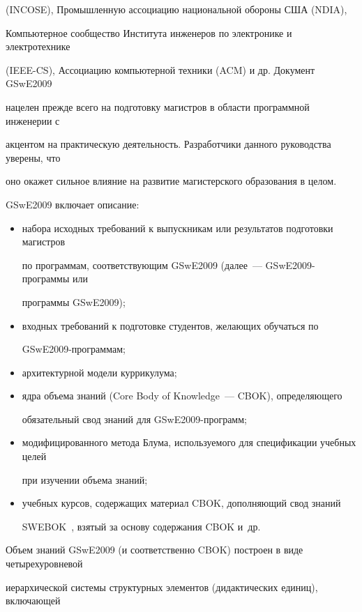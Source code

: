 (INCOSE), Промышленную ассоциацию национальной обороны США (NDIA), 

Компьютерное сообщество Института инженеров по электронике и электротехнике 

(IEEE-CS), Ассоциацию компьютерной техники (ACM) и др. Документ GSwE2009 

нацелен прежде всего на подготовку магистров в области программной инженерии с 

акцентом на практическую деятельность. Разработчики данного руководства уверены, что 

оно окажет сильное влияние на развитие магистерского образования в целом.



GSwE2009 включает описание:

\begin{itemize}

\item  набора исходных требований к выпускникам или результатов подготовки магистров 

по программам, соответствующим GSwE2009 (далее~--- GSwE2009-про\-грам\-мы или 

программы GSwE2009);

\item входных требований к подготовке студентов, желающих обучаться по 

GSwE2009-программам;

\item архитектурной модели куррикулума;

\item ядра объема знаний (Core Body of Knowledge~--- CBOK), определяющего 

обязательный свод знаний для GSwE2009-программ;

\item модифицированного метода Блума, используемого для спецификации учебных целей 

при изучении объема знаний;

\item учебных курсов, содержащих материал CBOK, дополняющий свод знаний 

SWEBOK~\cite{21-s}, взятый за основу содержания CBOK и~др. 

\end{itemize}



Объем знаний GSwE2009 (и соответственно CBOK) построен в виде четырехуровневой 

иерархической системы структурных элементов (дидактических единиц), включающей 

